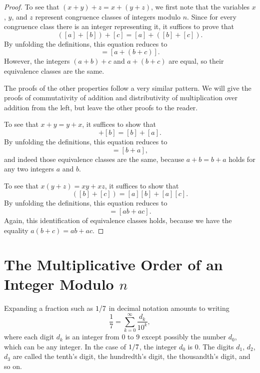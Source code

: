 \begin{proof}
  To see that $(x+y)+z=x+(y+z)$, we first note that the variables $x$, $y$, and $z$ represent congruence classes of integers modulo $n$. Since for every congruence class there is an integer representing it, it suffices to prove that
  \begin{equation*}
    ([a]+[b])+[c]=[a]+([b]+[c]).
  \end{equation*}
  By unfolding the definitions, this equation reduces to
  \begin{equation*}
    [(a+b)+c]=[a+(b+c)].
  \end{equation*}
  However, the integers $(a+b)+c$ and $a+(b+c)$ are equal, so their equivalence classes are the same.

  The proofs of the other properties follow a very similar pattern. We will give the proofs of commutativity of addition and distributivity of multiplication over addition from the left, but leave the other proofs to the reader.

  To see that $x+y=y+x$, it suffices to show that
  \begin{equation*}
    [a]+[b] = [b]+[a].
  \end{equation*}
  By unfolding the definitions, this equation reduces to
  \begin{equation*}
    [a+b]=[b+a],
  \end{equation*}
  and indeed those equivalence classes are the same, because $a+b=b+a$ holds for any two integers $a$ and $b$.

  To see that $x(y+z)=xy+xz$, it suffices to show that
  \begin{equation*}
    [a]([b]+[c]) = [a][b] + [a][c].
  \end{equation*}
  By unfolding the definitions, this equation reduces to
  \begin{equation*}
    [a(b+c)] = [ab+ac].
  \end{equation*}
  Again, this identification of equivalence classes holds, because we have the equality $a(b+c)=ab+ac$.
\end{proof}

\section{The Multiplicative Order of an Integer Modulo \texorpdfstring{$n$}{n}}

Expanding a fraction such as $1/7$ in decimal notation amounts to writing
\begin{equation*}
  \frac{1}{7}=\sum_{k=0}^\infty \frac{d_k}{10^k},
\end{equation*}
where each digit $d_k$ is an integer from $0$ to $9$ except possibly the number $d_0$, which can be any integer. In the case of $1/7$, the integer $d_0$ is $0$. The digits $d_1$, $d_2$, $d_3$ are called the tenth's digit, the hundredth's digit, the thousandth's digit, and so on.


